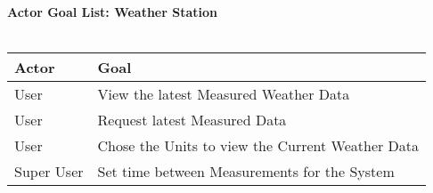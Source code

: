 \documentclass[letterpaper]{article}
\begin{document}
\noindent
\textbf{Actor Goal List:  Weather Station}\\\\
\vspace{4ex}
\begin{tabular}{|p{3.5cm}|p{5cm}|}\hline
\textbf{Actor} & \textbf{Goal}\\\hline
User & View the latest Measured Weather Data\\\hline
User & Request latest Measured Data\\\hline
User & Chose the Units to view the Current Weather Data\\\hline
Super User & Set time between Measurements for the 
System\\\hline
\end{tabular}
\end{document}

